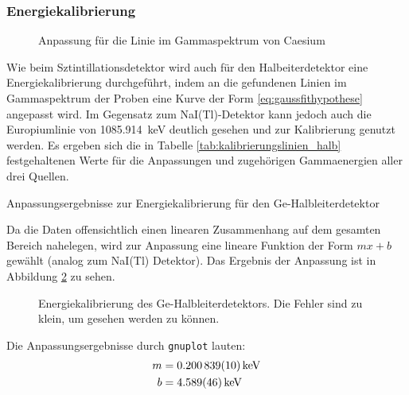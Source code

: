 \documentclass[11pt, a4paper]{article}
\numberwithin{equation}{section}
\begin{document}
\subsubsection{Energiekalibrierung}
\label{sec:kalibrierung_halb}
\begin{figure}[ht]
	\centering
	\resizebox{0.85\textwidth}{!}{
		
	}
	\caption{Anpassung für die Linie im Gammaspektrum von Caesium}
	\label{fig:fit_caesium}
\end{figure}
Wie beim Sztintillationsdetektor wird auch für den Halbeiterdetektor eine Energiekalibrierung durchgeführt, indem an die gefundenen Linien im Gammaspektrum der Proben eine Kurve der Form \eqref{eq:gaussfithypothese} angepasst wird.
Im Gegensatz zum NaI(Tl)-Detektor kann jedoch auch die Europiumlinie von \SI{1085.914}{\kilo\electronvolt} deutlich gesehen und zur Kalibrierung genutzt werden.
Es ergeben sich die in Tabelle \ref{tab:kalibrierungslinien_halb} festgehaltenen Werte für die Anpassungen und zugehörigen Gammaenergien aller drei Quellen.
\begin{table}[ht]
	\centering
	\resizebox{\textwidth}{!}{
	
	}
	\caption{Anpassungsergebnisse zur Energiekalibrierung für den Ge-Halbleiterdetektor}
	\label{tab:kalibrierungslinien_halb}
\end{table}
Da die Daten offensichtlich einen linearen Zusammenhang auf dem gesamten Bereich nahelegen, wird zur Anpassung eine lineare Funktion der Form $mx + b$ gewählt (analog zum NaI(Tl) Detektor).
Das Ergebnis der Anpassung ist in Abbildung \ref{fig:kalibrierung_halb} zu sehen.
\begin{figure}[ht]
	\centering
	
	\caption{Energiekalibrierung des Ge-Halbleiterdetektors. Die Fehler sind zu klein, um gesehen werden zu können.}
	\label{fig:kalibrierung_halb}
\end{figure}  
Die Anpassungsergebnisse durch \texttt{gnuplot} lauten:
\begin{align}
	m &= \SI{0.200839 +- 0.000010}{\kilo\electronvolt} \nonumber\\
	b &= \SI{4.589 +- 0.046}{\kilo\electronvolt}
	\label{eq:kalibrierung_halb}
\end{align}
\end{document}
